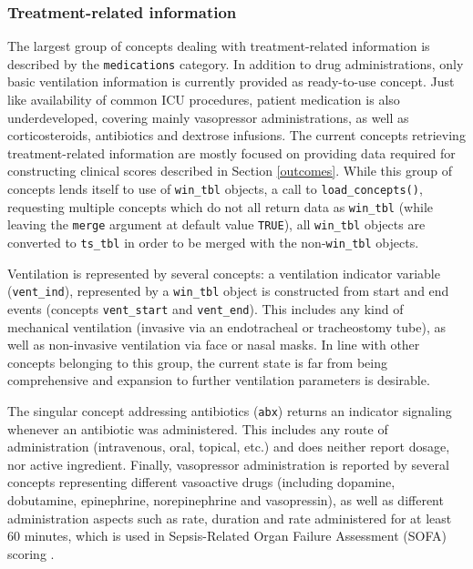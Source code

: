 \documentclass[
  notitle,
  nojss,
  noheadings]{jss}
\begin{document}
\hypertarget{treatment-related-information}{%
\subsubsection{Treatment-related
information}\label{treatment-related-information}}

The largest group of concepts dealing with treatment-related information
is described by the \texttt{medications} category. In addition to drug
administrations, only basic ventilation information is currently
provided as ready-to-use concept. Just like availability of common ICU
procedures, patient medication is also underdeveloped, covering mainly
vasopressor administrations, as well as corticosteroids, antibiotics and
dextrose infusions. The current concepts retrieving treatment-related
information are mostly focused on providing data required for
constructing clinical scores described in Section \ref{outcomes}. While
this group of concepts lends itself to use of \texttt{win\_tbl} objects,
a call to \texttt{load\_concepts()}, requesting multiple concepts which
do not all return data as \texttt{win\_tbl} (while leaving the
\texttt{merge} argument at default value \texttt{TRUE}), all
\texttt{win\_tbl} objects are converted to \texttt{ts\_tbl} in order to
be merged with the non-\texttt{win\_tbl} objects.

Ventilation is represented by several concepts: a ventilation indicator
variable (\texttt{vent\_ind}), represented by a \texttt{win\_tbl} object
is constructed from start and end events (concepts \texttt{vent\_start}
and \texttt{vent\_end}). This includes any kind of mechanical
ventilation (invasive via an endotracheal or tracheostomy tube), as well
as non-invasive ventilation via face or nasal masks. In line with other
concepts belonging to this group, the current state is far from being
comprehensive and expansion to further ventilation parameters is
desirable.

The singular concept addressing antibiotics (\texttt{abx}) returns an
indicator signaling whenever an antibiotic was administered. This
includes any route of administration (intravenous, oral, topical, etc.)
and does neither report dosage, nor active ingredient. Finally,
vasopressor administration is reported by several concepts representing
different vasoactive drugs (including dopamine, dobutamine, epinephrine,
norepinephrine and vasopressin), as well as different administration
aspects such as rate, duration and rate administered for at least 60
minutes, which is used in Sepsis-Related Organ Failure Assessment (SOFA)
scoring \citep{vincent1996}.
\end{document}
